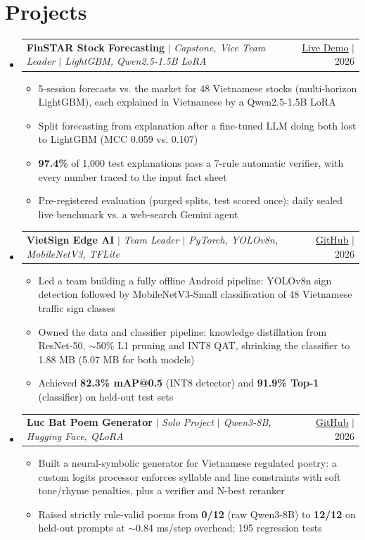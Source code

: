 \documentclass[letterpaper,11pt]{article}
\makeatletter
\newcommand{\resumeItem}[1]{\item\small{{#1 \vspace{-2pt}}}}
\newcommand{\resumeProjectHeading}[2]{
    \item
    \begin{tabular*}{0.97\textwidth}{l@{\extracolsep{\fill}}r}
      \small#1 & #2 \\
    \end{tabular*}\vspace{-7pt}
}
\newcommand{\resumeSubHeadingListStart}{\begin{itemize}[leftmargin=0.15in, label={}]}
\newcommand{\resumeSubHeadingListEnd}{\end{itemize}}
\newcommand{\resumeItemListStart}{\begin{itemize}}
\newcommand{\resumeItemListEnd}{\end{itemize}\vspace{-5pt}}
\makeatother
\begin{document}
\section{Projects}
  \resumeSubHeadingListStart
    \resumeProjectHeading
      {\textbf{FinSTAR Stock Forecasting} $|$ \emph{Capstone, Vice Team Leader $|$ LightGBM, Qwen2.5-1.5B LoRA}}{\href{https://finstar.pp.ua/app}{\underline{Live Demo}} $|$ 2026}
      \resumeItemListStart
        \resumeItem{5-session forecasts vs. the market for 48 Vietnamese stocks (multi-horizon LightGBM), each explained in Vietnamese by a Qwen2.5-1.5B LoRA}
        \resumeItem{Split forecasting from explanation after a fine-tuned LLM doing both lost to LightGBM (MCC 0.059 vs. 0.107)}
        \resumeItem{\textbf{97.4\%} of 1,000 test explanations pass a 7-rule automatic verifier, with every number traced to the input fact sheet}
        \resumeItem{Pre-registered evaluation (purged splits, test scored once); daily sealed live benchmark vs. a web-search Gemini agent}
      \resumeItemListEnd
    \resumeProjectHeading
      {\textbf{VietSign Edge AI} $|$ \emph{Team Leader $|$ PyTorch, YOLOv8n, MobileNetV3, TFLite}}{\href{https://github.com/VietSign-Edge-AI/VietSign-Edge-AI}{\underline{GitHub}} $|$ 2026}
      \resumeItemListStart
        \resumeItem{Led a team building a fully offline Android pipeline: YOLOv8n sign detection followed by MobileNetV3-Small classification of 48 Vietnamese traffic sign classes}
        \resumeItem{Owned the data and classifier pipeline: knowledge distillation from ResNet-50, $\sim$50\% L1 pruning and INT8 QAT, shrinking the classifier to 1.88 MB (5.07 MB for both models)}
        \resumeItem{Achieved \textbf{82.3\% mAP@0.5} (INT8 detector) and \textbf{91.9\% Top-1} (classifier) on held-out test sets}
      \resumeItemListEnd
    \resumeProjectHeading
      {\textbf{Luc Bat Poem Generator} $|$ \emph{Solo Project $|$ Qwen3-8B, Hugging Face, QLoRA}}{\href{https://github.com/zafkielzz/Luc_Bat_Poem_Generator}{\underline{GitHub}} $|$ 2026}
      \resumeItemListStart
        \resumeItem{Built a neural-symbolic generator for Vietnamese regulated poetry: a custom logits processor enforces syllable and line constraints with soft tone/rhyme penalties, plus a verifier and N-best reranker}
        \resumeItem{Raised strictly rule-valid poems from \textbf{0/12} (raw Qwen3-8B) to \textbf{12/12} on held-out prompts at $\sim$0.84 ms/step overhead; 195 regression tests}
      \resumeItemListEnd
  \resumeSubHeadingListEnd

\end{document}
